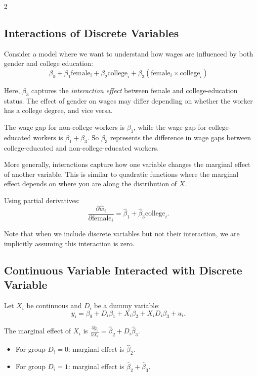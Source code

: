 \documentclass[12pt]{article}
\begin{document}
\begin{multicols}{2}
  \subsection*{Interactions of Discrete Variables}

  Consider a model where we want to understand how wages are influenced by both gender and college education:
  $$\beta_0 + \beta_1 \text{female}_i + \beta_2 \text{college}_i + \beta_3 (\text{female}_i \times \text{college}_i)$$

  Here, $\beta_3$ captures the \emph{interaction effect} between female and college-education status. The effect of gender on wages may differ depending on whether the worker has a college degree, and vice versa.

  The wage gap for non-college workers is $\beta_1$, while the wage gap for college-educated workers is $\beta_1 + \beta_3$. So $\beta_3$ represents the difference in wage gaps between college-educated and non-college-educated workers.

  More generally, interactions capture how one variable changes the marginal effect of another variable. This is similar to quadratic functions where the marginal effect depends on where you are along the distribution of $X$.

  Using partial derivatives:
  $$\frac{\partial \hat{w}_i}{\partial \text{female}_i} = \hat{\beta}_1 + \hat{\beta}_3 \text{college}_i.$$

  Note that when we include discrete variables but not their interaction, we are implicitly assuming this interaction is zero.

  \subsection*{Continuous Variable Interacted with Discrete Variable}

  Let $X_i$ be continuous and $D_i$ be a dummy variable:
  $$y_i = \beta_0 + D_i \beta_1 + X_i \beta_2 + X_i D_i \beta_3 + u_i.$$

  The marginal effect of $X_i$ is $\frac{\partial \hat{y}_i}{\partial X_i} = \hat{\beta}_2 + D_i \hat{\beta}_3$.
  \begin{itemize}
    \item For group $D_i = 0$: marginal effect is $\hat{\beta}_2$.
    \item For group $D_i = 1$: marginal effect is $\hat{\beta}_2 + \hat{\beta}_3$.
  \end{itemize}


\end{multicols}
\end{document}
